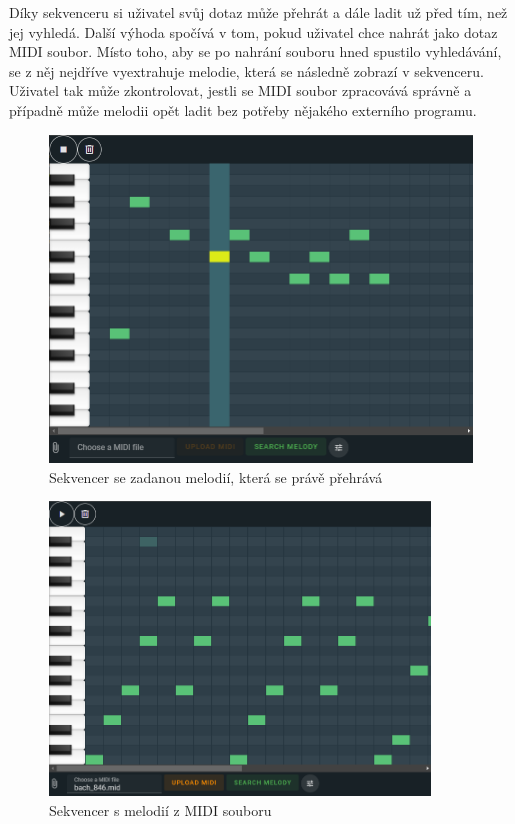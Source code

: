 Díky sekvenceru si uživatel svůj dotaz může přehrát a dále ladit už před tím, než jej vyhledá. Další výhoda spočívá v tom, pokud uživatel chce nahrát jako dotaz MIDI soubor. Místo toho, aby se po nahrání souboru hned spustilo vyhledávání, se z něj nejdříve vyextrahuje melodie, která se následně zobrazí v sekvenceru. Uživatel tak může zkontrolovat, jestli se MIDI soubor zpracovává správně a případně může melodii opět ladit bez potřeby nějakého externího programu.

\begin{figure}
    \centering
    \caption{Sekvencer se zadanou melodií, která se právě přehrává}
    \includegraphics[width=\textwidth]{images/seq_playing.png}
\end{figure}

\begin{figure}
    \centering
    \caption{Sekvencer s melodií z MIDI souboru}
    \includegraphics[width=0.9\textwidth]{images/seq_bach.png}
\end{figure}

